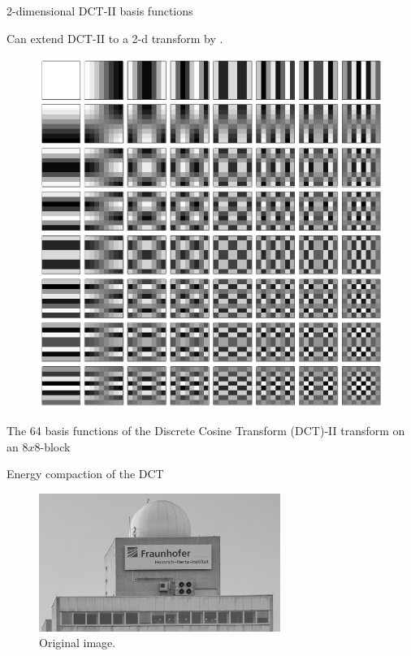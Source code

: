 \begin{frame} {2-dimensional DCT-II basis functions}
\bit
\item Can extend DCT-II to a 2-d transform by .  
\eit
\begin{figure}
\includegraphics[width=.35\textwidth]{TrCoding/DCT8x8Basis.png}
\end{figure}
\bit
\item The 64 basis functions of the Discrete Cosine Transform (DCT)-II transform on an $8x8$-block
\eit
\end{frame}

\begin{frame}{Energy compaction of the DCT}
\begin{figure}
\includegraphics[width=0.70\textwidth]{TrCoding/HHI_gray_ausschnitt.png}
\captionsetup{labelformat=empty}
\caption{Original image.}
\end{figure}
\end{frame}


